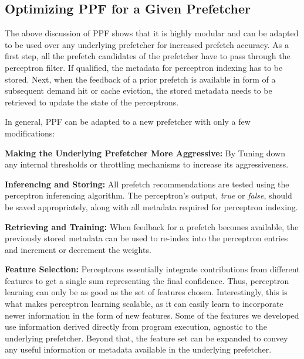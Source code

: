 \subsection{Optimizing PPF for a Given Prefetcher}
\label{Arch-Generalizing}
The above discussion of PPF shows that it is highly modular and can be
adapted to be used over any {\color{red}underlying} prefetcher for increased prefetch
accuracy. As a first step, all the prefetch
candidates of the prefetcher have to pass through the perceptron filter. 
If qualified, the metadata for perceptron indexing has to be stored. 
Next, when the feedback of a prior prefetch is available in form
of a subsequent demand hit or cache eviction, the stored
metadata needs to be retrieved to update the state of the perceptrons.


In general, PPF can be adapted to a {\color{red}new prefetcher} with only a
few modifications:

\noindent \textbf{Making the {\color{red}Underlying} Prefetcher More Aggressive:} By Tuning 
down any internal thresholds or throttling mechanisms to increase its
aggressiveness.

\noindent \textbf{Inferencing and Storing:} All prefetch
recommendations are tested using the perceptron inferencing algorithm.
The perceptron's output, \textit{true} or \textit{false}, should be
saved appropriately, along with all metadata required for perceptron
indexing.

\noindent \textbf{Retrieving and Training:} When feedback for a
prefetch becomes available, the previously stored metadata can be used
to re-index into the perceptron entries and increment or decrement the
weights.

\noindent \textbf{Feature Selection:} Perceptrons essentially
integrate contributions from different features to get a single sum
representing the final confidence.  Thus, perceptron learning can only
be as good as the set of features chosen.  Interestingly, this is what
makes perceptron learning scalable, as it can easily learn to
incorporate newer information in the form of new features.  Some of
the features we developed use information derived directly from
program execution, agnostic to the {\color{red}underlying} prefetcher.  Beyond that,
the feature set can be expanded to convey any useful information or
metadata available in the {\color{red}underlying} prefetcher.

